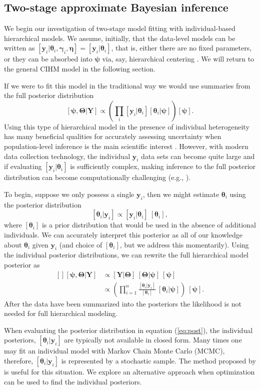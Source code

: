 \documentclass[12pt]{article}
\newcommand{\by}{\mathbf{y}}
\newcommand{\bt}{\boldsymbol{\theta}}
\newcommand{\bn}{\boldsymbol{\eta}}
\newcommand{\bT}{\boldsymbol{\Theta}}
\newcommand{\bp}{\boldsymbol{\psi}}
\newcommand{\bg}{\boldsymbol{\gamma}}
\newcommand{\bY}{\mathbf{Y}}
\begin{document}
\subsection{Two-stage approximate Bayesian inference}

We begin our investigation of two-stage model fitting with individual-based hierarchical models. We assume, initially, that the data-level models can be written as $[\by_i|\bt_i, \bg_i, \bn]=[\by_i|\bt_i]$, that is, either there are no fixed parameters, or they can be absorbed into $\bp$ via, say, hierarchical centering \citep{Gelfand:1996zq}. We will return to the general CIHM model in the following section. 

If we were to fit this model in the traditional way we would use summaries from the full posterior distribution 
\[
[\bp, \bT|\bY] \propto \left(\prod_i[\by_i|\bt_i][\bt_i|\bp]\right) [\bp].
\]
Using this type of hierarchical model in the presence of individual heterogeneity has many beneficial qualities for accurately assessing uncertainty when population-level inference is the main scientific interest \citep{Cressie:2009rr}. However, with modern data collection technology, the individual $\by_i$ data sets can become quite large and if evaluating $[\by_i|\bt_i]$ is sufficiently complex, making inference to the full posterior distribution can become computationally challenging (e.g., \citealt{hooten2016hierarchical}).

To begin, suppose we only possess a single $\by_i$, then we might estimate $\bt_i$ using the posterior distribution
\[
[\bt_i|\by_i] \propto [\by_i|\bt_i]\ [\bt_i],
\]
where $[\bt_i]$ is a prior distribution that would be used in the absence of additional individuals. We can accurately interpret this posterior as all of our knowledge about $\bt_i$ given $\by_i$ (and choice of $[\bt_i]$, but we address this momentarily). Using the individual posterior distributions, we can rewrite the full hierarchical model posterior as 
\begin{equation}
\label{eq:post}
\begin{aligned}[]
[\bp,\bT|\bY] &\propto [\bY|\bT]\ [\bT|\bp]\ [\bp]\\
& \propto \left(\prod_{i=1}^n\frac{[\bt_i|\by_i]}{[\bt_i]}\ [\bt_i|\bp]\right)\ [\bp].
\end{aligned}
\end{equation}
After the data have been summarized into the posteriors the likelihood is not needed for full hierarchical modeling. 

When evaluating the posterior distribution in equation (\ref{eq:post}), the individual posteriors, $[\bt_i|\by_i]$ are typically not available in closed form. Many times one may fit an individual model with Markov Chain Monte Carlo (MCMC), therefore, $[\bt_i|\by_i]$ is represented by a stochastic sample. The method proposed by \citet{lunn2013fully} is useful for this situation. We explore an alternative approach when optimization can be used to find the individual posteriors.
\end{document}
